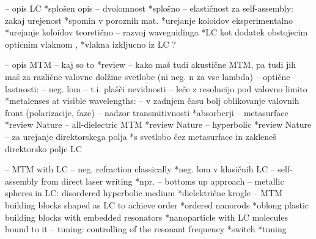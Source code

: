 \documentclass[a4paper,10pt]{article}
\begin{document}

-- opis LC *splošen opis \cite{degennes}
  -- dvolomnost *splošno \cite{hecht-optics}
  -- elastičnost za self-assembly: zakaj urejenost *spomin v poroznih mat. \cite{tanaka-lc-memory-porous} 
                                                   *urejanje koloidov eksperimentalno \cite{musevic-2013-assembly,smalyukh-2009-assembly} 
                                                   *urejanje koloidov teoretično \cite{zumer-2012-colloidal-assembly}
  -- razvoj waveguidinga *LC kot dodatek obstojecim opticnim vlaknom \cite{kitzerow-2014-lc-fibre,zografopoulos-2012-lc-fibre}, 
                         *vlakna izkljucno iz LC \cite{cancula-2016-waveguiding}? 

-- opis MTM
  -- kaj so to *review \cite{wegener-2011-nature-review}
  -- kako maš tudi akustične MTM, pa tudi jih maš za različne valovne dolžine svetlobe (ni neg. n za vse lambda)
  -- optične lastnosti: 
    -- neg. lom \cite{schultz-2000-first-mtm,zhang-2008-fishnet}
    -- t.i. plašči nevidnosti \cite{zhang-2015-skin-cloak}
    -- leče z resolucijo pod valovno limito *metalenses at visible wavelengths: \cite{capasso-2016-metalens}
    -- v zadnjem času bolj oblikovanje valovnih front (polarizacije, faze) \cite{capasso-2014-flat-optics-metasurface}
    -- nadzor transmitivnosti *absorberji \cite{padilla-2012-mtm-absorbers}
    -- metasurface *review Nature \cite{meinzer-2014-metasurface}
    -- all-dielectric MTM *review Nature \cite{jacob-2016-all-dielectric}
    -- hyperbolic *review Nature \cite{kivshar-2013-hyperbolic}
    -- za urejanje direktorskega polja *s svetlobo čez metasurface in zakleneš direktorsko polje LC \cite{ozaki-2016-patterned-lc}

-- MTM with LC
  -- neg. refraction classically *neg. lom v klasičnih LC \cite{lavrentovich-2006-lc-neg,assanto-2007-nematicons-lc-neg}
  -- self-assembly from direct laser writing *npr. \cite{tartan-2017-dlw} -- bottoms up approach
  -- metallic spheres in LC: disordered hyperbolic medium *dielektrične krogle \cite{xuan-2013-nanoparticle-lc,khoo-2014-nanoparticle-lc}
  -- MTM building blocks shaped as LC to achieve order *ordered nanorods \cite{lavrentovich-2008-gold-nanorods,smalyukh-2010-self-alignment,lavrentovich-2009-nanorods} 
                                                       *oblong plastic building blocks with embedded resonators \cite{shadrivov-2016-meta-liquid-crystal}
                                                       *nanoparticle with LC molecules bound to it \cite{goodby-2011-lc-gold-mtm}
  -- tuning: controlling of the resonant frequency *switch \cite{buchnev-2015-lc-mtm-switch}
                                                   *tuning \cite{zhang-2007-lc-mtm-tuning}
\end{document}
